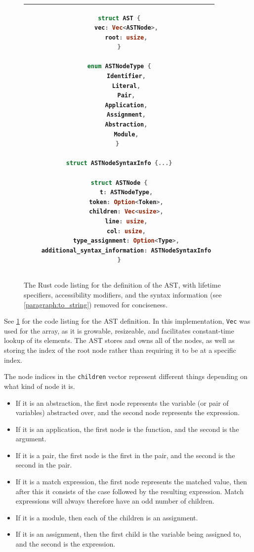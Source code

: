 \begin{figure}[t]
    \centering
    \begin{tabular}{c}
    \hline
    \begin{lstlisting}[language=Rust]
struct AST {
    vec: Vec<ASTNode>,
    root: usize,
}

enum ASTNodeType {
    Identifier,
    Literal,
    Pair,
    Application,
    Assignment,
    Abstraction,
    Module,
} 

struct ASTNodeSyntaxInfo {...}

struct ASTNode {
    t: ASTNodeType,
    token: Option<Token>,
    children: Vec<usize>,
    line: usize,
    col: usize,
    type_assignment: Option<Type>,
    additional_syntax_information: ASTNodeSyntaxInfo
}
    \end{lstlisting}
    \\\hline
    \end{tabular}
    \caption{The Rust code listing for the definition of the AST, with lifetime specifiers, accessibility modifiers, and the syntax information (see \ref{paragraph:to_string}) removed for conciseness.}
    \label{fig:ast_lst}
\end{figure}

See \ref{fig:ast_lst} for the code listing for the \ac{AST} definition. In this implementation, \verb|Vec| was used for the array, as it is growable, resizeable, and facilitates constant-time lookup of its elements. The \ac{AST} stores and owns all of the nodes, as well as storing the index of the root node rather than requiring it to be at a specific index. 

The node indices in the \verb|children| vector represent different things depending on what kind of node it is. 
\begin{itemize}
    \item If it is an abstraction, the first node represents the variable (or pair of variables) abstracted over, and the second node represents the expression.
    \item If it is an application, the first node is the function, and the second is the argument.
    \item If it is a pair, the first node is the first in the pair, and the second is the second in the pair.
    \item If it is a match expression, the first node represents the matched value, then after this it consists of the case followed by the resulting expression. Match expressions will always therefore have an odd number of children.
    \item If it is a module, then each of the children is an assignment.
    \item If it is an assignment, then the first child is the variable being assigned to, and the second is the expression.
\end{itemize}


